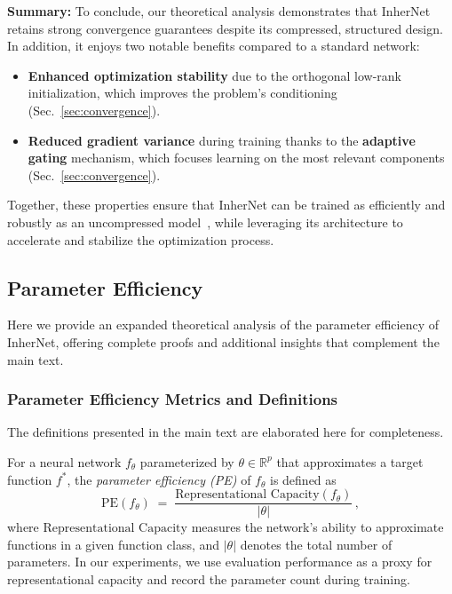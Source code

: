 \documentclass{article} %
\begin{document}
\textbf{Summary:} To conclude, our theoretical analysis demonstrates that InherNet retains strong convergence guarantees despite its compressed, structured design. In addition, it enjoys two notable benefits compared to a standard network:

\begin{itemize}[leftmargin=*, topsep=2pt, itemsep=2pt]
    \item \textbf{Enhanced optimization stability} due to the orthogonal low-rank initialization, which improves the problem's conditioning (Sec.~\ref{sec:convergence}).  
    \item \textbf{Reduced gradient variance} during training thanks to the \textbf{adaptive gating} mechanism, which focuses learning on the most relevant components (Sec.~\ref{sec:convergence}).
\end{itemize}

Together, these properties ensure that InherNet can be trained as efficiently and robustly as an uncompressed model~\citep{li2025flowmm,jiang2025acckv,jiang2025purekv}, while leveraging its architecture to accelerate and stabilize the optimization process.



\subsection{Parameter Efficiency}
\label{app:parameter}

Here we provide an expanded theoretical analysis of the parameter efficiency of InherNet, offering complete proofs and additional insights that complement the main text.

\subsubsection{Parameter Efficiency Metrics and Definitions}

The definitions presented in the main text are elaborated here for completeness.

\begin{definition}
\label{def:pe}
For a neural network $f_\theta$ parameterized by $\theta \in \mathbb{R}^p$ that approximates a target function $f^*$, the \emph{parameter efficiency (PE)} of $f_\theta$ is defined as 
\[
 \text{PE}(f_\theta) \;=\; \frac{\text{Representational Capacity}(f_\theta)}{|\theta|}\,,
\] 
where $\text{Representational Capacity}$ measures the network's ability to approximate functions in a given function class, and $|\theta|$ denotes the total number of parameters. In our experiments, we use evaluation performance as a proxy for representational capacity and record the parameter count during training.
\end{definition}
\end{document}
